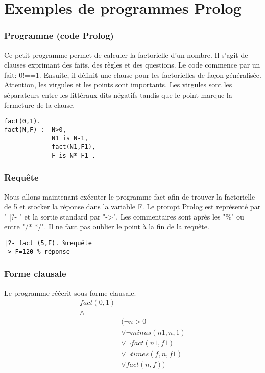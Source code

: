 \section{Exemples de programmes Prolog}

\subsubsection{Programme (code Prolog)}
Ce petit programme permet de calculer la factorielle d'un nombre. Il s'agit de clauses exprimant des faits, des règles et des questions. Le code commence par un fait: 0!==1. Ensuite, il définit une clause pour les factorielles de façon généralisée. Attention, les virgules et les points sont importants. Les virgules sont les séparateurs entre les littéraux dits négatifs tandis que le point marque la fermeture de la clause.
\begin{verbatim}
fact(0,1).
fact(N,F) :- N>0, 
			 N1 is N-1,
			 fact(N1,F1), 
			 F is N* F1 .
\end{verbatim}
\subsubsection{Requête} Nous allons maintenant exécuter le programme fact afin de trouver la factorielle de 5 et stocker la réponse dans la variable F. Le prompt Prolog est représenté par " |?- " et la sortie standard par "->". Les commentaires sont après les "\%" ou entre "/* */". Il ne faut pas oublier le point à la fin de la requête.
\begin{verbatim} 
|?- fact (5,F). %requête
-> F=120 % réponse
\end{verbatim}

\subsubsection{Forme clausale}
Le programme réécrit sous forme clausale. 
\begin{align*}
fact(0,1) \\
 \wedge & \\
&( \neg n > 0 \\
&	\vee \neg minus( n1, n, 1) \\
&	\vee \neg fact(n1, f1) \\
&	\vee \neg times(f, n, f1) \\
&	\vee fact(n, f) ) \\
\end{align*}



